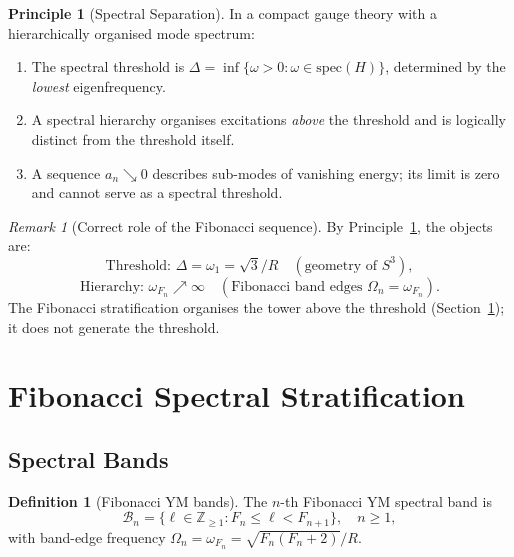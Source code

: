 \documentclass[
  aps,
  prd,
  reprint,
  superscriptaddress,
  nofootinbib,
  longbibliography,
  amsmath,
  amssymb
]{revtex4-2}
\theoremstyle{plain}
\theoremstyle{definition}
\newtheorem{definition}[theorem]{Definition}
\newtheorem{principle}{Principle}
\theoremstyle{remark}
\newtheorem{remark}[theorem]{Remark}
\begin{document}
\begin{principle}[Spectral Separation]
  \label{princ:sep}
  In a compact gauge theory with a hierarchically organised mode spectrum:
  \begin{enumerate}[label=\textup{(\arabic*)}]
  \item The spectral threshold is $\Delta = \inf\{\omega>0:
    \omega\in\mathrm{spec}(H)\}$, determined by the \emph{lowest}
    eigenfrequency.
  \item A spectral hierarchy organises excitations \emph{above} the
    threshold and is logically distinct from the threshold itself.
  \item A sequence $a_n\searrow0$ describes sub-modes of vanishing
    energy; its limit is zero and cannot serve as a spectral threshold.
  \end{enumerate}
\end{principle}

\begin{remark}[Correct role of the Fibonacci sequence]
  By Principle~\ref{princ:sep}, the objects are:
  \[
    \text{Threshold: }\Delta = \omega_1 = \sqrt3/R
      \quad(\text{geometry of }S^3),
  \]
  \[
    \text{Hierarchy: }\omega_{F_n}\nearrow\infty
      \quad(\text{Fibonacci band edges }\Omega_n=\omega_{F_n}).
  \]
  The Fibonacci stratification organises the tower above the threshold
  (Section~\ref{sec:fibonacci}); it does not generate the threshold.
\end{remark}

\section{Fibonacci Spectral Stratification}
\label{sec:fibonacci}

\subsection{Spectral Bands}

\begin{definition}[Fibonacci YM bands]
  The $n$-th Fibonacci YM spectral band is
  \begin{equation}
    \mathcal{B}_n = \{\ell\in\mathbb{Z}_{\geq1}: F_n\leq\ell<F_{n+1}\},
    \quad n\geq1,
    \label{eq:bands}
  \end{equation}
  with band-edge frequency $\Omega_n = \omega_{F_n} = \sqrt{F_n(F_n+2)}/R$.
\end{definition}
\end{document}
